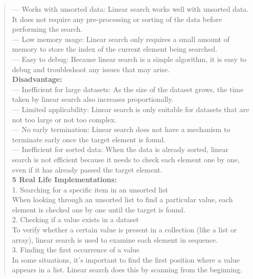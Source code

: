 \begin{quote}
    --- Works with unsorted data: Linear search works well with unsorted data. It does not require any pre-processing or sorting of the data before performing the search. \\
    
    --- Low memory usage: Linear search only requires a small amount of memory to store the index of the current element being searched. \\
    
    --- Easy to debug: Because linear search is a simple algorithm, it is easy to debug and troubleshoot any issues that may arise. \\
    
    \textbf{Disadvantage:} \\
    --- Inefficient for large datasets: As the size of the dataset grows, the time taken by linear search also increases proportionally. \\
    
    --- Limited applicability: Linear search is only suitable for datasets that are not too large or not too complex. \\
    
    --- No early termination: Linear search does not have a mechanism to terminate early once the target element is found. \\
    
    --- Inefficient for sorted data: When the data is already sorted, linear search is not efficient because it needs to check each element one by one, even if it has already passed the target element. \\
    
    \textbf{5 Real Life Implementations:} \\
    1. Searching for a specific item in an unsorted list \\
    When looking through an unsorted list to find a particular value, each element is checked one by one until the target is found. \\
    
    2. Checking if a value exists in a dataset \\
    To verify whether a certain value is present in a collection (like a list or array), linear search is used to examine each element in sequence. \\
    
    3. Finding the first occurrence of a value \\
    In some situations, it’s important to find the first position where a value appears in a list. Linear search does this by scanning from the beginning. \\
    

\end{quote}
